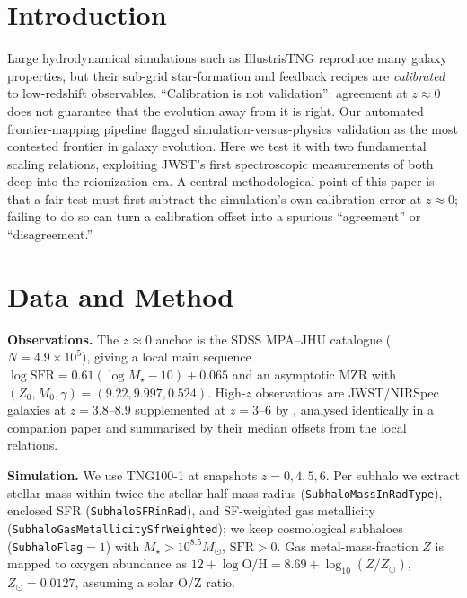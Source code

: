 \documentclass[twocolumn]{aastex631}
\begin{document}

\section{Introduction}
Large hydrodynamical simulations such as IllustrisTNG \citep{pillepich18,nelson19} reproduce many galaxy properties, but their sub-grid star-formation and feedback recipes are \emph{calibrated} to low-redshift observables. ``Calibration is not validation'': agreement at $z\approx0$ does not guarantee that the evolution away from it is right. Our automated frontier-mapping pipeline flagged simulation-versus-physics validation as the most contested frontier in galaxy evolution. Here we test it with two fundamental scaling relations, exploiting JWST's first spectroscopic measurements of both deep into the reionization era. A central methodological point of this paper is that a fair test must first subtract the simulation's own calibration error at $z\approx0$; failing to do so can turn a calibration offset into a spurious ``agreement'' or ``disagreement.''

\section{Data and Method}
\textbf{Observations.} The $z\approx0$ anchor is the SDSS MPA--JHU catalogue \citep{brinchmann04,tremonti04} ($N=4.9\times10^{5}$), giving a local main sequence $\log\mathrm{SFR}=0.61(\log M_\star-10)+0.065$ and an asymptotic MZR with $(Z_0,M_0,\gamma)=(9.22,9.997,0.524)$. High-$z$ observations are JWST/NIRSpec galaxies at $z=3.8$--$8.9$ \citep{nakajima23} supplemented at $z=3$--$6$ by \citet{lisiecki25}, analysed identically in a companion paper and summarised by their median offsets from the local relations.

\textbf{Simulation.} We use TNG100-1 \citep{nelson19} at snapshots $z=0,4,5,6$. Per subhalo we extract stellar mass within twice the stellar half-mass radius (\texttt{SubhaloMassInRadType}), enclosed SFR (\texttt{SubhaloSFRinRad}), and SF-weighted gas metallicity (\texttt{SubhaloGasMetallicitySfrWeighted}); we keep cosmological subhaloes (\texttt{SubhaloFlag}$=1$) with $M_\star>10^{8.5}M_\odot$, $\mathrm{SFR}>0$. Gas metal-mass-fraction $Z$ is mapped to oxygen abundance as $12+\log\mathrm{O/H}=8.69+\log_{10}(Z/Z_\odot)$, $Z_\odot=0.0127$, assuming a solar O/Z ratio.
\end{document}
